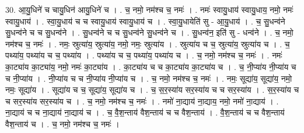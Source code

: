 \documentclass[17pt]{extarticle}
\begin{document}
30. आ॒यु॒धिने॑ च चायु॒धिन॑ आयु॒धिने॑ च । . च॒ नमो॒ नम॑श्च च॒ नमः॑ । . नमः॑ स्वायु॒धाय॑ स्वायु॒धाय॒ नमो॒ नमः॑ स्वायु॒धाय॑ । . स्वा॒यु॒धाय॑ च च स्वायु॒धाय॑ स्वायु॒धाय॑ च । . स्वा॒यु॒धायेति॑ सु - आ॒यु॒धाय॑ । . च॒ सु॒धन्व॑ने सु॒धन्व॑ने च च सु॒धन्व॑ने । . सु॒धन्व॑ने च च सु॒धन्व॑ने सु॒धन्व॑ने च । . सु॒धन्व॑न॒ इति॑ सु - धन्व॑ने । . च॒ नमो॒ नम॑श्च च॒ नमः॑ । . नमः॒ स्रुत्या॑य॒ स्रुत्या॑य॒ नमो॒ नमः॒ स्रुत्या॑य । . स्रुत्या॑य च च॒ स्रुत्या॑य॒ स्रुत्या॑य च । . च॒ पथ्या॑य॒ पथ्या॑य च च॒ पथ्या॑य । . पथ्या॑य च च॒ पथ्या॑य॒ पथ्या॑य च । . च॒ नमो॒ नम॑श्च च॒ नमः॑ । . नमः॑ का॒ट्या॑य का॒ट्या॑य॒ नमो॒ नमः॑ का॒ट्या॑य । . का॒ट्या॑य च च का॒ट्या॑य का॒ट्या॑य च । . च॒ नी॒प्या॑य नी॒प्या॑य च च नी॒प्या॑य । . नी॒प्या॑य च च नी॒प्या॑य नी॒प्या॑य च । . च॒ नमो॒ नम॑श्च च॒ नमः॑ । . नमः॒ सूद्या॑य॒ सूद्या॑य॒ नमो॒ नमः॒ सूद्या॑य । . सूद्या॑य च च॒ सूद्या॑य॒ सूद्या॑य च । . च॒ स॒र॒स्या॑य सर॒स्या॑य च च सर॒स्या॑य । . स॒र॒स्या॑य च च सर॒स्या॑य सर॒स्या॑य च । . च॒ नमो॒ नम॑श्च च॒ नमः॑ । . नमो॑ ना॒द्याय॑ ना॒द्याय॒ नमो॒ नमो॑ ना॒द्याय॑ । . ना॒द्याय॑ च च ना॒द्याय॑ ना॒द्याय॑ च । . च॒ वै॒श॒न्ताय॑ वैश॒न्ताय॑ च च वैश॒न्ताय॑ । . वै॒श॒न्ताय॑ च च वैश॒न्ताय॑ वैश॒न्ताय॑ च । . च॒ नमो॒ नम॑श्च च॒ नमः॑ । \newline
\end{document}
